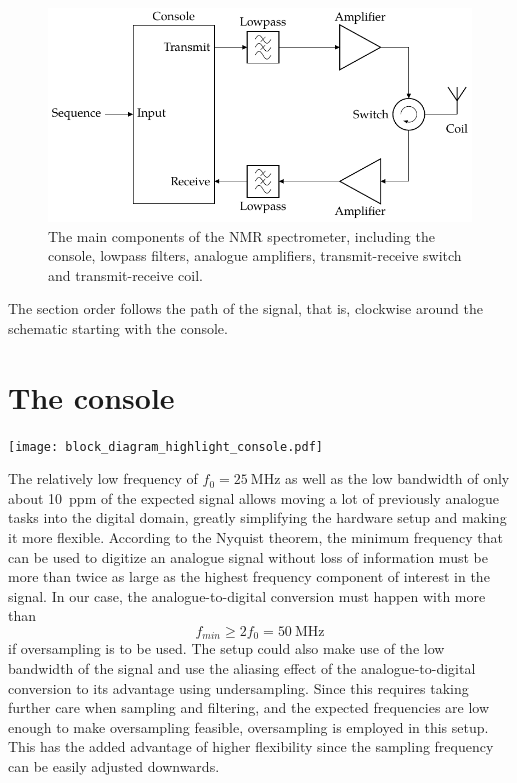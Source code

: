 \begin{figure}[hbt]
    \centering
    \includegraphics{images/block_diagram.pdf}
    \caption{ The main components of the \magnethical{} NMR spectrometer, including the console, lowpass filters, analogue amplifiers, transmit-receive switch and transmit-receive coil.}
\end{figure}

The section order follows the path of the signal, that is, clockwise around the schematic starting with the console.

\section{The console}
\begin{marginfigure}
    \texttt{[image: block\_diagram\_highlight\_console.pdf]}
\end{marginfigure}

The relatively low frequency of \(f_0 = \qty{25}{\mega\hertz}\) as well as the low bandwidth of only about \qty{10}{ppm} of the expected signal allows moving a lot of previously analogue tasks into the digital domain, greatly simplifying the hardware setup and making it more flexible. According to the Nyquist theorem, the minimum frequency that can be used to digitize an analogue signal without loss of information must be more than twice as large as the highest frequency component of interest in the signal. In our case, the analogue-to-digital conversion must happen with more than
\[
    f_{min} \ge 2f_0 = \qty{50}{\mega\hertz}
\]
if oversampling is to be used. The setup could also make use of the low bandwidth of the signal and use the aliasing effect of the analogue-to-digital conversion to its advantage using undersampling. Since this requires taking further care when sampling and filtering, and the expected frequencies are low enough to make oversampling feasible, oversampling is employed in this setup. This has the added advantage of higher flexibility since the sampling frequency can be easily adjusted downwards.

